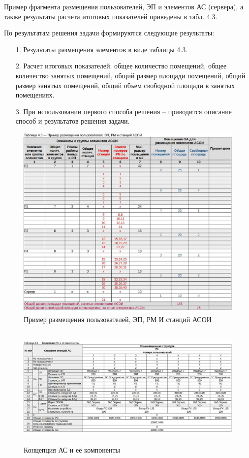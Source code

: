 \documentclass[12pt, a4paper, simple]{eskdtext}
\begin{document}
    Пример фрагмента размещения пользователей, ЭП и элементов АС (сервера),
    а также ре­зультаты расчета итоговых показателей приведены в табл. 4.3.

    По результатам решения задачи формируются следующие результаты:
    \begin{enumerate}
        \item[1.] Результаты размещения элементов в виде таблицы 4.3.
        \item[2.] Расчет итоговых показателей: общее количество помещений,
        общее количество занятых помеще­ний, общий размер площади помещений,
        общий размер занятых помещений, общий объем свободной площади в занятых помещениях.
        \item[3.] При использовании первого способа решения – приводится описание способ и результатов реше­ния задачи.
    \end{enumerate}

    \begin{figure}[ht!]
        \centering
        \includegraphics[width=14cm]
            {_docs/Таблица4-3ПримерРазмещенияПользователейЭПРМИСтанцийАСОИ.jpg}
        \caption{Пример размещения пользователей, ЭП, РМ И станций АСОИ}
    \end{figure}

    \newpage

    \begin{figure}[!hp]
        \centering
        \includegraphics[height=6cm]
            {_docs/Таблица3-1КонцепцияАСИЕеКомпоненты__лаб2_П1.jpg}
        \caption{Концепция АС и её компоненты}
    \end{figure}
\end{document}

